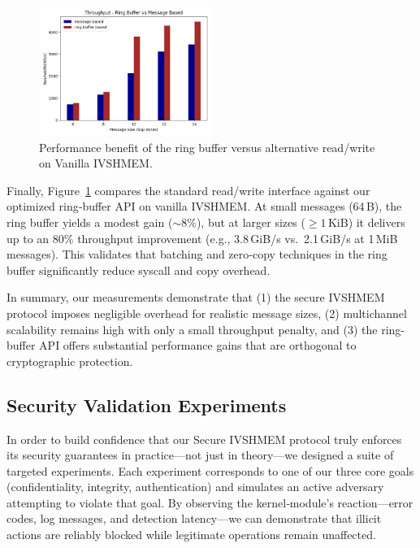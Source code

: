 \documentclass[conference]{IEEEtran}
\begin{document}
\begin{figure}[!h]
  \centering
  \includegraphics[width=0.5\textwidth]{figures/ring_buffer.png}
  \caption{Performance benefit of the ring buffer versus alternative read/write on Vanilla IVSHMEM.}
  \label{fig:perf_ring_buffer}
\end{figure}

Finally, Figure~\ref{fig:perf_ring_buffer} compares the standard read/write
interface against our optimized ring‐buffer API on vanilla IVSHMEM. At small
messages (64\,B), the ring buffer yields a modest gain (\(\sim8\%\)), but at
larger sizes (\(\geq1\,\mathrm{KiB}\)) it delivers up to an \(80\%\) throughput
improvement (e.g., 3.8\,GiB/s vs.\ 2.1\,GiB/s at 1\,MiB messages). This
validates that batching and zero‐copy techniques in the ring buffer
significantly reduce syscall and copy overhead.



In summary, our measurements demonstrate that (1) the secure IVSHMEM protocol imposes negligible overhead for realistic message sizes, (2) multichannel scalability remains high with only a small throughput penalty, and (3) the ring-buffer API offers substantial performance gains that are orthogonal to cryptographic protection.  

\subsection{Security Validation Experiments}

In order to build confidence that our Secure IVSHMEM protocol truly enforces its security guarantees in practice—not just in theory—we designed a suite of targeted experiments.  Each experiment corresponds to one of our three core goals (confidentiality, integrity, authentication) and simulates an active adversary attempting to violate that goal.  By observing the kernel‐module’s reaction—error codes, log messages, and detection latency—we can demonstrate that illicit actions are reliably blocked while legitimate operations remain unaffected.
\end{document}
